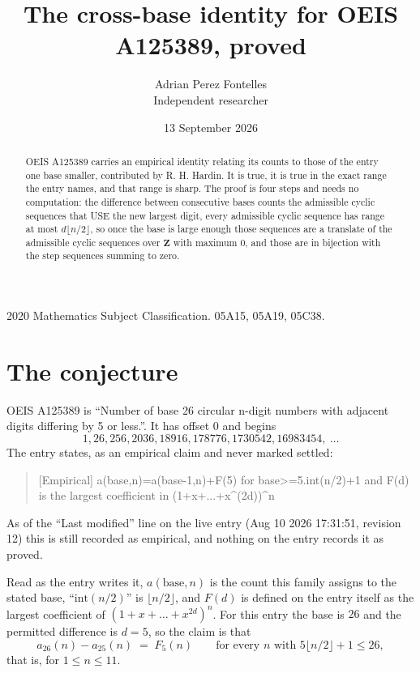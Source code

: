 \documentclass[11pt,a4paper]{article}
\title{The cross-base identity for OEIS A125389, proved}
\author{Adrian Perez Fontelles\\ \small Independent researcher}
\date{13 September 2026}
\theoremstyle{plain}
\theoremstyle{definition}
\begin{document}
\maketitle

\begin{abstract}
OEIS A125389 carries an empirical identity relating its counts to those of the entry one base
smaller, contributed by R. H. Hardin. It is true, it is true in the exact range the entry
names, and that range is sharp. The proof is four steps and needs no computation: the
difference between consecutive bases counts the admissible cyclic sequences that USE the new
largest digit, every admissible cyclic sequence has range at most $d\lfloor n/2\rfloor$, so
once the base is large enough those sequences are a translate of the admissible cyclic
sequences over $\mathbf{Z}$ with maximum $0$, and those are in bijection with the step
sequences summing to zero.
\end{abstract}

\noindent\small 2020 Mathematics Subject Classification. 05A15, 05A19, 05C38.\normalsize

\section{The conjecture}

OEIS A125389 is ``Number of base 26 circular n-digit numbers with adjacent digits differing by 5 or less.''. It has offset $0$ and begins
\[
1, 26, 256, 2036, 18916, 178776, 1730542, 16983454,\ \dots
\]
The entry states, as an empirical claim and never marked settled:
\begin{quote}
[Empirical] a(base,n)=a(base-1,n)+F(5) for base>=5.int(n/2)+1 and F(d) is the largest coefficient in (1+x+...+x\^{}(2d))\^{}n
\end{quote}
As of the ``Last modified'' line on the live entry (Aug 10 2026 17:31:51, revision 12)
this is still recorded as empirical, and nothing on the entry records it as proved.

Read as the entry writes it, $a(\mathrm{base},n)$ is the count this family assigns to the
stated base, ``$\mathrm{int}(n/2)$'' is $\lfloor n/2\rfloor$, and $F(d)$ is defined on the
entry itself as the largest coefficient of $(1+x+\dots+x^{2d})^{n}$. For this entry
the base is $26$ and the permitted difference is $d=5$, so the claim is that
\[
a_{26}(n)-a_{25}(n)\;=\;F_{5}(n)
\qquad\text{for every } n \text{ with } 5\lfloor n/2\rfloor+1\le26,
\]
that is, for $1\le n\le11$.
\end{document}
